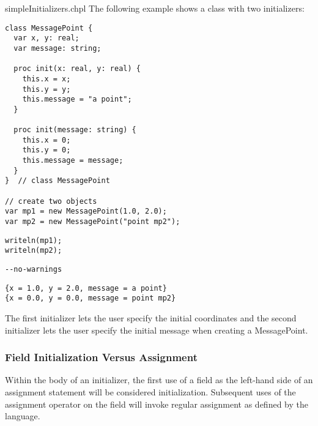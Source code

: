 \begin{chapelexample}{simpleInitializers.chpl}
The following example shows a class with two initializers:
\begin{chapel}
\begin{verbatim}
class MessagePoint {
  var x, y: real;
  var message: string;

  proc init(x: real, y: real) {
    this.x = x;
    this.y = y;
    this.message = "a point";
  }

  proc init(message: string) {
    this.x = 0;
    this.y = 0;
    this.message = message;
  }
}  // class MessagePoint

// create two objects
var mp1 = new MessagePoint(1.0, 2.0);
var mp2 = new MessagePoint("point mp2");
\end{verbatim}
\end{chapel}
\begin{chapelpost}
\begin{verbatim}
writeln(mp1);
writeln(mp2);
\end{verbatim}
\end{chapelpost}
\begin{chapelcompopts}
\begin{verbatim}
--no-warnings
\end{verbatim}
\end{chapelcompopts}
\begin{chapeloutput}
\begin{verbatim}
{x = 1.0, y = 2.0, message = a point}
{x = 0.0, y = 0.0, message = point mp2}
\end{verbatim}
\end{chapeloutput}
The first initializer lets the user specify the initial coordinates
and the second initializer lets the user specify the initial message
when creating a MessagePoint.
\end{chapelexample}

\subsubsection{Field Initialization Versus Assignment}
\label{Field_Initialization_Versus_Assignment}

Within the body of an initializer, the first use of a field as the left-hand
side of an assignment statement will be considered initialization. Subsequent
uses of the assignment operator on the field will invoke regular assignment as
defined by the language.

